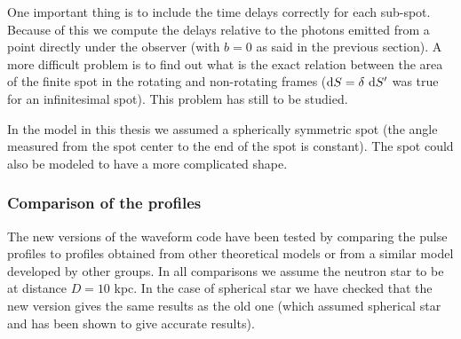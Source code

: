 \documentclass{wihuri}
\def\be{\begin{equation}}
\def\ee{\end{equation}}
\def\d{{\rm d}}
\def\Dop{\delta}
\begin{document}
One important thing is to include the time delays correctly for each sub-spot. Because of this we compute the delays relative to the photons emitted from a point directly under the observer (with $b=0$ as said in the previous section). %
A more difficult problem is to find out what is the exact relation between the area of the finite spot in the rotating and non-rotating frames ($\d S=\Dop\ \d S'$ was true for an infinitesimal spot). This problem has still to be studied.


In the model in this thesis we assumed a spherically symmetric spot (the angle measured from the spot center to the end of the spot is constant). The spot could also be modeled to have a more complicated shape. %



\subsubsection{Comparison of the profiles}

The new versions of the waveform code have been tested by comparing the pulse profiles to profiles obtained from other theoretical models or from a similar model developed by other groups. In all comparisons we assume the neutron star to be at distance $D = 10$ kpc. In the case of spherical star we have checked that the new version gives the same results as the old one (which assumed spherical star and has been shown to give accurate results). 
\end{document}
